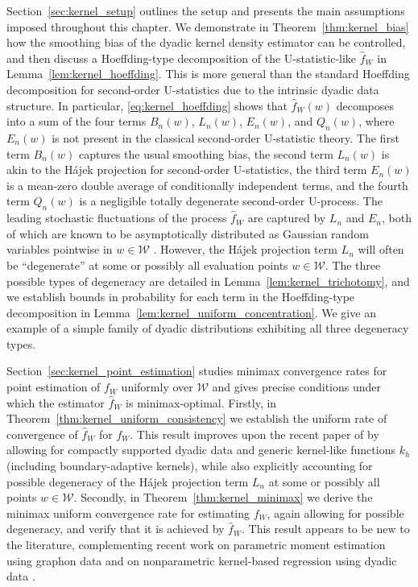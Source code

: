 \documentclass[11pt,lof]{puthesis}
\newcommand{\cW}{\ensuremath{\mathcal{W}}}
\theoremstyle{break}
\theoremstyle{proof}
\begin{document}
Section~\ref{sec:kernel_setup} outlines the setup and presents the main
assumptions imposed throughout this chapter. We demonstrate in
Theorem~\ref{thm:kernel_bias} how the smoothing bias of the dyadic kernel
density estimator can be controlled, and then discuss a Hoeffding-type
decomposition of the U-statistic-like $\hat{f}_W$
in Lemma~\ref{lem:kernel_hoeffding}. This is more general than
the standard Hoeffding decomposition for second-order U-statistics due to the
intrinsic dyadic data structure. In particular, \eqref{eq:kernel_hoeffding}
shows that $\hat{f}_W(w)$ decomposes into a sum of the four terms $B_n(w)$,
$L_n(w)$, $E_n(w)$, and $Q_n(w)$, where $E_n(w)$ is not present in the classical
second-order U-statistic theory. The first term $B_n(w)$ captures the usual
smoothing bias, the second term $L_n(w)$ is akin to the H{\'a}jek projection
for second-order U-statistics, the third term $E_n(w)$ is a mean-zero double
average of conditionally independent terms, and the fourth term $Q_n(w)$ is a
negligible totally degenerate second-order U-process. The leading stochastic
fluctuations of the process $\hat{f}_W$ are captured by $L_n$ and $E_n$, both
of which are known to be asymptotically distributed as Gaussian random
variables pointwise in $w\in\cW$ \citep{graham2024kernel}. However, the
H{\'a}jek projection term $L_n$ will often be ``degenerate'' at some or
possibly all evaluation points $w\in\cW$.
The three possible types of degeneracy are detailed in
Lemma~\ref{lem:kernel_trichotomy},
and we establish bounds in probability for each term in the Hoeffding-type
decomposition in Lemma~\ref{lem:kernel_uniform_concentration}.
We give an example of a simple family of dyadic distributions
exhibiting all three degeneracy types.

Section~\ref{sec:kernel_point_estimation} studies minimax convergence rates for
point estimation of $f_W$ uniformly over $\cW$ and gives precise conditions
under which the estimator $\hat{f}_W$ is minimax-optimal. Firstly, in
Theorem~\ref{thm:kernel_uniform_consistency} we establish the uniform rate of
convergence of $\hat{f}_W$ for $f_W$. This result improves upon the recent paper
of \citet{chiang2020empirical} by allowing for compactly supported dyadic data
and generic kernel-like functions $k_h$ (including boundary-adaptive kernels),
while also explicitly accounting for possible degeneracy of the H\'{a}jek
projection term $L_n$ at some or possibly all points $w\in\cW$.
Secondly, in Theorem~\ref{thm:kernel_minimax} we derive the minimax uniform
convergence rate for estimating $f_W$, again allowing for possible degeneracy,
and verify that it is achieved by $\hat f_W$. This result appears to be new to
the literature, complementing recent work on parametric moment estimation using
graphon data \citep{gao2021minimax} and on nonparametric kernel-based
regression using dyadic data \citep{graham2021minimax}.
\end{document}
